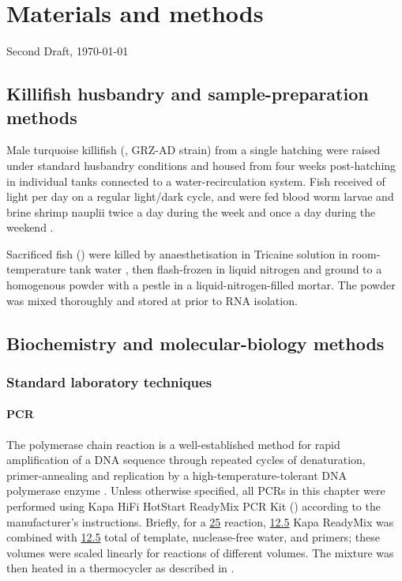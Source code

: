 \chapter{Materials and methods}  
\onehalfspacing

\ifdefineChapter
	{\LARGE Second Draft, \today}
\fi

\pagebreak

\section{Killifish husbandry and sample-preparation methods}
\label{sec:methods_husbandry}

Male turquoise killifish (\nfu, GRZ-AD strain) from a single hatching were raised under standard husbandry conditions \parencite{dodzian2018husbandry} and housed from four weeks post-hatching in individual  tanks connected to a water-recirculation system. Fish received  of light per day on a regular light/dark cycle, and were fed blood
worm larvae and brine shrimp nauplii twice a day during the week and once a day during the weekend \parencite{dodzian2018husbandry,smith2017microbiota}.

Sacrificed fish () were killed by anaesthetisation in  Tricaine solution in room-temperature tank water \parencite{carter2011tricaine}, then flash-frozen in liquid nitrogen and ground to a homogenous powder with a pestle in a liquid-nitrogen-filled mortar. The powder was mixed thoroughly and stored at  prior to RNA isolation.

\section{Biochemistry and molecular-biology methods}

\subsection{Standard laboratory techniques}

\subsubsection{PCR}
\label{sec:methods_molec_standard_pcr}

The polymerase chain reaction is a well-established method for rapid amplification of a DNA sequence through repeated cycles of denaturation, primer-annealing and replication by a high-temperature-tolerant DNA polymerase enzyme \parencite{paul2010hotstartpcr}. Unless otherwise specified, all PCRs in this chapter were performed using  Kapa HiFi HotStart ReadyMix PCR Kit () according to the manufacturer's instructions. Briefly, for a \ul{25} reaction, \ul{12.5} Kapa ReadyMix was combined with \ul{12.5} total of template, nuclease-free water, and  primers; these volumes were scaled linearly for reactions of different volumes. The mixture was then heated in a thermocycler as described in .


